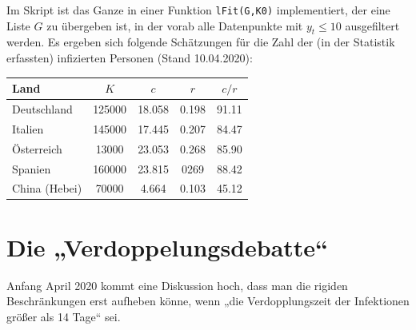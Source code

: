 \documentclass[a4paper,11pt]{article}
\begin{document}
Im Skript ist das Ganze in einer Funktion \texttt{lFit(G,K0)} implementiert,
der eine Liste $G$ zu übergeben ist, in der vorab alle Datenpunkte mit $y_t\le
10$ ausgefiltert werden.  Es ergeben sich folgende Schätzungen für die Zahl
der (in der Statistik erfassten) infizierten Personen (Stand 10.04.2020):
\begin{center}
  \begin{tabular}{|l|c|c|c|c|}\hline
    Land & $K$ & $c$ & $r$ & $c/r$ \\\hline
    Deutschland & 125000 & 18.058 & 0.198 & 91.11\\
    Italien & 145000 & 17.445 & 0.207 & 84.47\\
    Österreich & 13000 & 23.053 & 0.268 & 85.90 \\
    Spanien & 160000 & 23.815 & 0269 & 88.42 \\
    China (Hebei) & 70000 & 4.664 & 0.103 & 45.12\\\hline
  \end{tabular}
\end{center}

\section{Die „Verdoppelungsdebatte“}

Anfang April 2020 kommt eine Diskussion hoch, dass man die rigiden
Beschränkungen erst aufheben könne, wenn „die Verdopplungszeit der Infektionen
größer als 14 Tage“ sei.
\end{document}
